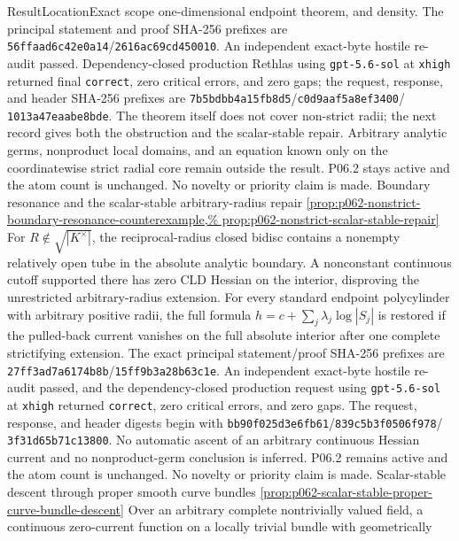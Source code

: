\begin{AppLProvenanceLedger}{Result}{Location}{Exact scope}
{   one-dimensional endpoint theorem, and density.  The principal statement
   and proof SHA-256 prefixes are
   \texttt{56ffaad6c42e0a14}/\texttt{2616ac69cd450010}.  An independent
   exact-byte hostile re-audit passed.  Dependency-closed production Rethlas
   using \texttt{gpt-5.6-sol} at \texttt{xhigh} returned final
   \texttt{correct}, zero critical errors, and zero gaps; the request,
   response, and header SHA-256 prefixes are
   \texttt{7b5bdbb4a15fb8d5}/\texttt{c0d9aaf5a8ef3400}/%
   \texttt{1013a47eaabe8bde}.  The theorem itself does not cover non-strict
   radii; the next record gives both the obstruction and the scalar-stable
   repair.  Arbitrary analytic germs, nonproduct local domains, and an
   equation known only on the coordinatewise strict radial core remain
   outside the result.  P06.2 stays active and the atom count is unchanged.
   No novelty or priority claim is made.}
\AppLProvenanceRecord
  {Boundary resonance and the scalar-stable arbitrary-radius repair}
  {\cref{prop:p062-nonstrict-boundary-resonance-counterexample,%
   prop:p062-nonstrict-scalar-stable-repair}}
  {For \(R\notin\sqrt{|K^\times|}\), the reciprocal-radius closed bidisc
   contains a nonempty relatively open tube in the absolute analytic
   boundary.  A nonconstant continuous cutoff supported there has zero CLD
   Hessian on the interior, disproving the unrestricted arbitrary-radius
   extension.  For every standard endpoint polycylinder with arbitrary
   positive radii, the full formula
   \(h=c+\sum_j\lambda_j\log|S_j|\) is restored if the pulled-back current
   vanishes on the full absolute interior after one complete strictifying
   extension.  The exact principal statement/proof SHA-256 prefixes are
   \texttt{27ff3ad7a6174b8b}/\texttt{15ff9b3a28b63c1e}.
   An independent exact-byte hostile re-audit passed, and the
   dependency-closed production request using \texttt{gpt-5.6-sol} at
   \texttt{xhigh} returned \texttt{correct}, zero critical errors, and zero
   gaps.  The request, response, and header digests begin with
   \texttt{bb90f025d3e6fb61}/\texttt{839c5b3f0506f978}/%
   \texttt{3f31d65b71c13800}.  No automatic ascent of an arbitrary
   continuous Hessian current and no nonproduct-germ conclusion is inferred.
   P06.2 remains active and the atom count is unchanged.  No novelty or
   priority claim is made.}
\AppLProvenanceRecord
  {Scalar-stable descent through proper smooth curve bundles}
  {\cref{prop:p062-scalar-stable-proper-curve-bundle-descent}}
  {Over an arbitrary complete nontrivially valued field, a continuous
   zero-current function on a locally trivial bundle with geometrically
}
\end{AppLProvenanceLedger}
